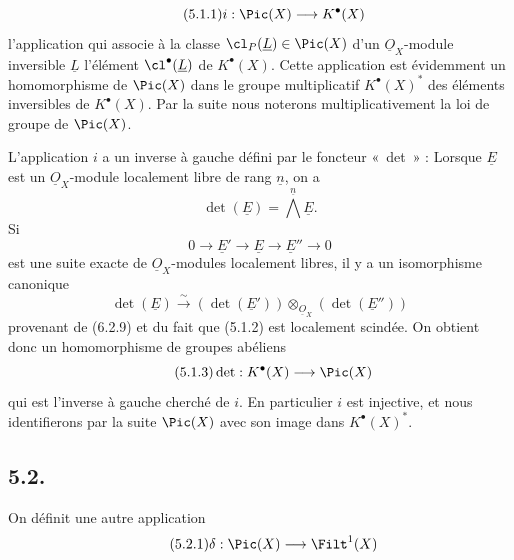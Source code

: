 
\begin{equation}\tag{5.1.1}
 i:\Pic(X)\longrightarrow K^{\bullet}(X)
\end{equation}
l'application qui associe à la classe \(\cl_P(\underline{L})\in\Pic(X)\) d'un \(\underline{O}_X\)-module inversible \(\underline{L}\) l'élément \(\cl^{\bullet}(\underline{L})\) de \(K^{\bullet}(X)\). Cette application est évidemment un homomorphisme de \(\Pic(X)\) dans le groupe multiplicatif \(K^{\bullet}(X)^*\) des éléments inversibles de \(K^{\bullet}(X)\). Par la suite nous noterons multiplicativement la loi de groupe de \(\Pic(X)\).

L'application \(i\) a un inverse à gauche défini par le foncteur «~det~» : Lorsque \(\underline{E}\) est un \(\underline{O}_X\)-module localement libre de rang \(\underline{n}\), on a
\[
 \det(\underline{E})=\bigwedge^{\underline{n}} \underline{E}.
\]
Si
\begin{equation}\tag{5.1.2}
0\longrightarrow \underline{E}'\longrightarrow \underline{E}\longrightarrow \underline{E}''\longrightarrow0
\end{equation}
est une suite exacte de \(\underline{O}_X\)-modules localement libres, il y a un isomorphisme canonique
\[
 \det(\underline{E})\xrightarrow{\sim}(\det(\underline{E}'))\otimes_{\underline{O}_X}(\det(\underline{E}''))
\]
provenant de (6.2.9) et du fait que (5.1.2) est localement scindée. On obtient donc un homomorphisme de groupes abéliens
\begin{equation}\tag{5.1.3}
 \det:K^{\bullet}(X)\longrightarrow\Pic(X)
\end{equation}
qui est l'inverse à gauche cherché de \(i\). En particulier \(i\) est injective, et nous identifierons par la suite \(\Pic(X)\) avec son image dans \(K^{\bullet}(X)^*\).

\subsection*{5.2.}
On définit une autre application
\begin{equation}\tag{5.2.1}
 \delta:\Pic(X)\longrightarrow\Filt^1(X)
\end{equation}
